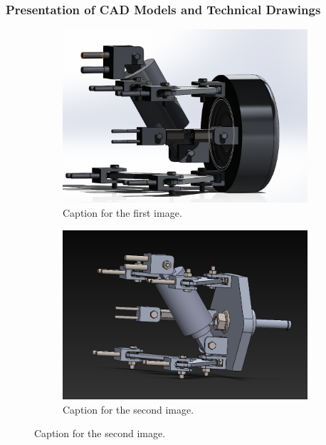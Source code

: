 \subsubsection{Presentation of CAD Models and Technical Drawings}
\begin{figure}[ht!]
  \centering
  \begin{subfigure}{.5\textwidth}
    \centering
    \includegraphics[width=\linewidth]{texfiles/mech/eimg/suspension/CAD_Deign of Rear Suspension.png}
    \caption{Caption for the first image.}
    \label{fig:sub1}
  \end{subfigure}%
  \begin{subfigure}{.5\textwidth}
    \centering
    \includegraphics[width=\linewidth]{texfiles/mech/eimg/suspension/CAD Design Front wishbone Assembly.png}
    \caption{Caption for the second image.}
    \label{fig:sub2}
  \end{subfigure}%
\end{figure}
